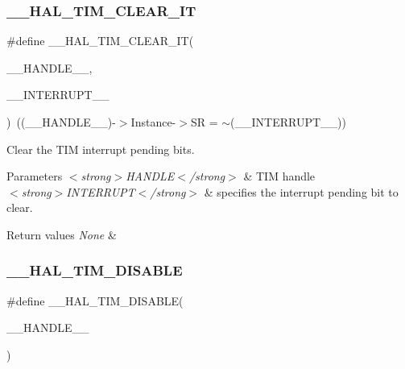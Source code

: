 \subsubsection{\texorpdfstring{\+\_\+\+\_\+\+H\+A\+L\+\_\+\+T\+I\+M\+\_\+\+C\+L\+E\+A\+R\+\_\+\+IT}{\_\_HAL\_TIM\_CLEAR\_IT}}
{\footnotesize\ttfamily \#define \+\_\+\+\_\+\+H\+A\+L\+\_\+\+T\+I\+M\+\_\+\+C\+L\+E\+A\+R\+\_\+\+IT(\begin{DoxyParamCaption}\item[{}]{\+\_\+\+\_\+\+H\+A\+N\+D\+L\+E\+\_\+\+\_\+,  }\item[{}]{\+\_\+\+\_\+\+I\+N\+T\+E\+R\+R\+U\+P\+T\+\_\+\+\_\+ }\end{DoxyParamCaption})~((\+\_\+\+\_\+\+H\+A\+N\+D\+L\+E\+\_\+\+\_\+)-\/$>$Instance-\/$>$SR = $\sim$(\+\_\+\+\_\+\+I\+N\+T\+E\+R\+R\+U\+P\+T\+\_\+\+\_\+))}



Clear the T\+IM interrupt pending bits. 


\begin{DoxyParams}{Parameters}
{\em $<$strong$>$\+H\+A\+N\+D\+L\+E$<$/strong$>$} & T\+IM handle \\
\hline
{\em $<$strong$>$\+I\+N\+T\+E\+R\+R\+U\+P\+T$<$/strong$>$} & specifies the interrupt pending bit to clear. \\
\hline
\end{DoxyParams}

\begin{DoxyRetVals}{Return values}
{\em None} & \\
\hline
\end{DoxyRetVals}
\mbox{\label{group___t_i_m___exported___macros_ga6a5e653e0e06a04151b74eb1a5f96eb6}} 
\subsubsection{\texorpdfstring{\+\_\+\+\_\+\+H\+A\+L\+\_\+\+T\+I\+M\+\_\+\+D\+I\+S\+A\+B\+LE}{\_\_HAL\_TIM\_DISABLE}}
{\footnotesize\ttfamily \#define \+\_\+\+\_\+\+H\+A\+L\+\_\+\+T\+I\+M\+\_\+\+D\+I\+S\+A\+B\+LE(\begin{DoxyParamCaption}\item[{}]{\+\_\+\+\_\+\+H\+A\+N\+D\+L\+E\+\_\+\+\_\+ }\end{DoxyParamCaption})}

